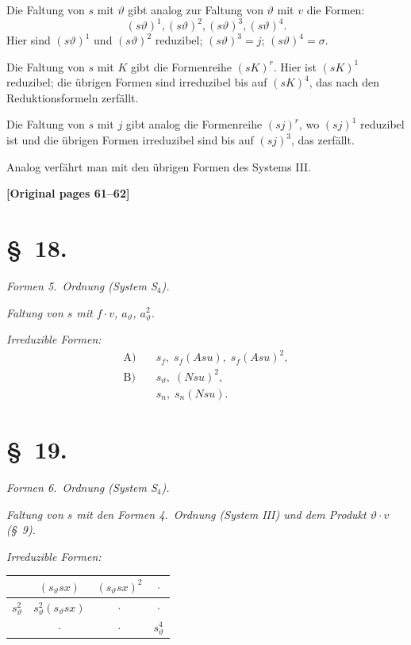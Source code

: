 \documentclass[12pt,a4paper]{article}
\begin{document}
Die Faltung von $s$ mit $\vartheta$ gibt analog zur Faltung von $\vartheta$ mit $v$ die Formen:
\[(s\vartheta)^1, (s\vartheta)^2, (s\vartheta)^3, (s\vartheta)^4.\]
Hier sind $(s\vartheta)^1$ und $(s\vartheta)^2$ reduzibel; $(s\vartheta)^3 = j$; $(s\vartheta)^4 = \sigma$.

Die Faltung von $s$ mit $K$ gibt die Formenreihe $(sK)^r$. Hier ist $(sK)^1$ reduzibel; die übrigen Formen sind irreduzibel bis auf $(sK)^4$, das nach den Reduktionsformeln zerfällt.

Die Faltung von $s$ mit $j$ gibt analog die Formenreihe $(sj)^r$, wo $(sj)^1$ reduzibel ist und die übrigen Formen irreduzibel sind bis auf $(sj)^3$, das zerfällt.

Analog verfährt man mit den übrigen Formen des Systems III.


\noindent\textbf{[Original pages 61--62]}

\section*{\S\ 18.}

\textit{Formen 5.\ Ordnung (System S$_4$).}

\textit{Faltung von $s$ mit $f \cdot v$, $a_\vartheta$, $a_\vartheta^2$.}

\textit{Irreduzible Formen:}
\begin{align*}
\text{A)} \quad &s_f, \; s_f(Asu), \; s_f(Asu)^2, \\
\text{B)} \quad &s_\vartheta, \; (Nsu)^2, \\
   &s_n, \; s_n(Nsu).
\end{align*}

\section*{\S\ 19.}

\textit{Formen 6.\ Ordnung (System S$_4$).}

\textit{Faltung von $s$ mit den Formen 4.\ Ordnung (System III) und dem Produkt $\vartheta \cdot v$ (\S\ 9).}

\textit{Irreduzible Formen:}
\begin{center}
\begin{tabular}{c|ccc}
& $(s_\vartheta sx)$ & $(s_\vartheta sx)^2$ & $\cdot$ \\
\hline
$s_\vartheta^2$ & $s_\vartheta^2 (s_\vartheta sx)$ & $\cdot$ & $\cdot$ \\
& $\cdot$ & $\cdot$ & $s_\vartheta^4$
\end{tabular}
\end{center}
\end{document}
